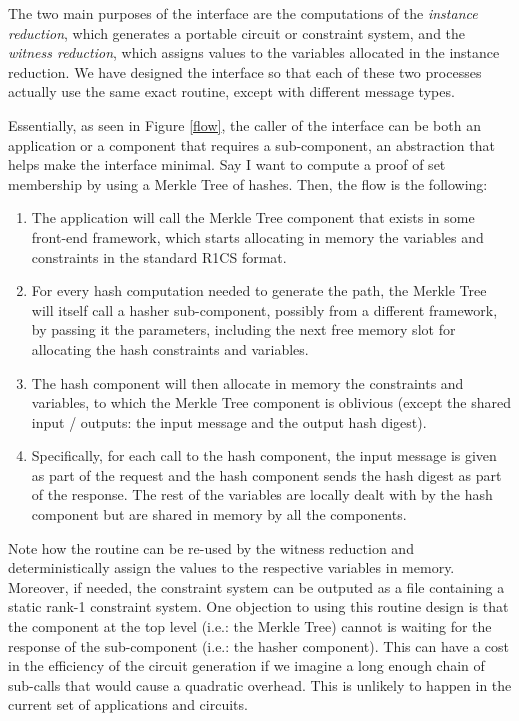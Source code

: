         
The two main purposes of the interface are the computations of the \emph{instance reduction}, which generates a portable circuit or constraint system, and the \emph{witness reduction}, which assigns values to the variables allocated in the instance reduction. We have designed the interface so that each of these two processes actually use the same exact routine, except with different message types.

Essentially, as seen in Figure \ref{flow}, the caller of the interface can be both an application or a component that requires a sub-component, an abstraction that helps make the interface minimal. Say I want to compute a proof of set membership by using a Merkle Tree of hashes. Then, the flow is the following:
\begin{enumerate} 
	\item The application will call the Merkle Tree component that exists in some front-end framework, which starts allocating in memory the variables and constraints in the standard R1CS format.
	\item For every hash computation needed to generate the path, the Merkle Tree will itself call a hasher sub-component, possibly from a different framework, by passing it the parameters, including the next free memory slot for allocating the hash constraints and variables.
	\item The hash component will then allocate in memory the constraints and variables, to which the Merkle Tree component is oblivious (except the shared input / outputs: the input message and the output hash digest).
	\item Specifically, for each call to the hash component, the input message is given as part of the request and the hash component sends the hash digest as part of the response. The rest of the variables are locally dealt with by the hash component but are shared in memory by all the components.
\end{enumerate}

Note how the routine can be re-used by the witness reduction and deterministically assign the values to the respective variables in memory. Moreover, if needed, the constraint system can be outputed as a file containing a static rank-1 constraint system. One objection to using this routine design is that the component at the top level (i.e.: the Merkle Tree) cannot is waiting for the response of the sub-component (i.e.: the hasher component). This can have a cost in the efficiency of the circuit generation if we imagine a long enough chain of sub-calls that would cause a quadratic overhead. This is unlikely to happen in the current set of applications and circuits. 
	
